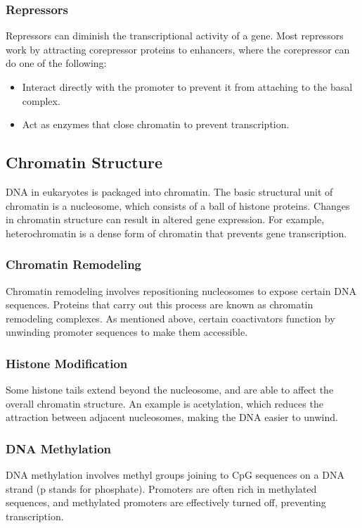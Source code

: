 \documentclass[12pt,titlepage]{article}
\begin{document}
      \subsubsection{Repressors}
        Repressors can diminish the transcriptional activity of a gene. Most repressors work by attracting corepressor proteins to enhancers, where the corepressor
        can do one of the following:
        \begin{itemize}
          \item Interact directly with the promoter to prevent it from attaching to the basal complex.
          \item Act as enzymes that close chromatin to prevent transcription.
        \end{itemize}

    \subsection{Chromatin Structure}
      DNA in eukaryotes is packaged into chromatin. The basic structural unit of chromatin is a nucleosome, which consists of a ball of histone proteins.
      Changes in chromatin structure can result in altered gene expression. For example, heterochromatin is a dense form of chromatin that prevents gene
      transcription.

      \subsubsection{Chromatin Remodeling}
        Chromatin remodeling involves repositioning nucleosomes to expose certain DNA sequences. Proteins that carry out this process are known as chromatin
        remodeling complexes. As mentioned above, certain coactivators function by unwinding promoter sequences to make them accessible.

      \subsubsection{Histone Modification}
        Some histone tails extend beyond the nucleosome, and are able to affect the overall chromatin structure. An example is acetylation, which reduces
        the attraction between adjacent nucleosomes, making the DNA easier to unwind.

      \subsubsection{DNA Methylation}
        DNA methylation involves methyl groups joining to CpG sequences on a DNA strand (p stands for phosphate). Promoters are often rich in methylated
        sequences, and methylated promoters are effectively turned off, preventing transcription.
\end{document}
